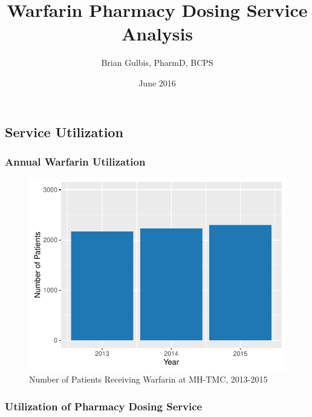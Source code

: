 \documentclass[]{article}
\title{Warfarin Pharmacy Dosing Service Analysis}
\author{Brian Gulbis, PharmD, BCPS}
\date{June 2016}
\begin{document}
\maketitle

\subsection{Service Utilization}\label{service-utilization}

\subsubsection{Annual Warfarin
Utilization}\label{annual-warfarin-utilization}

\begin{figure}[H]
\centering
\includegraphics{warfarin_analysis_ASHP_files/figure-latex/graph_utilization-1.pdf}
\caption{Number of Patients Receiving Warfarin at MH-TMC, 2013-2015}
\end{figure}

\subsubsection{Utilization of Pharmacy Dosing
Service}\label{utilization-of-pharmacy-dosing-service}
\end{document}

